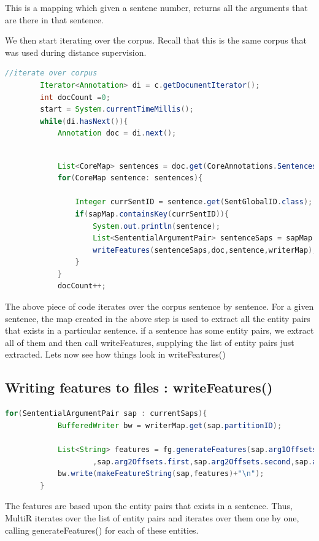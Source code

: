 \documentclass[a4paper,10pt]{report}
\begin{document}
This is a mapping which given a sentene number, returns all the arguments that are there in that sentence. 

We then start iterating over the corpus. Recall that this is the same corpus that was used during distance supervision. 
\begin{lstlisting}[language=java]
//iterate over corpus
    	Iterator<Annotation> di = c.getDocumentIterator();
    	int docCount =0;
    	start = System.currentTimeMillis();
    	while(di.hasNext()){
    		Annotation doc = di.next();
\end{lstlisting}

\begin{lstlisting}[language=java]

    		List<CoreMap> sentences = doc.get(CoreAnnotations.SentencesAnnotation.class);
    		for(CoreMap sentence: sentences){
    				
    			Integer currSentID = sentence.get(SentGlobalID.class);
    			if(sapMap.containsKey(currSentID)){
    				System.out.println(sentence);
    				List<SententialArgumentPair> sentenceSaps = sapMap.get(currSentID);
    				writeFeatures(sentenceSaps,doc,sentence,writerMap);
    			}
    		}
    		docCount++;
\end{lstlisting}
The above piece of code iterates over the corpus sentence by sentence.
For a given sentence, the map created in the above step is used to extract all the entity pairs that
exists in a particular sentence. 
if a sentence has some entity pairs, we extract all of them and then call writeFeatures, supplying the list
of entity pairs just extracted.
Lets now see how things look in writeFeatures()


\subsection{Writing features to files : writeFeatures()}

\begin{lstlisting}[language=java]
 for(SententialArgumentPair sap : currentSaps){
			BufferedWriter bw = writerMap.get(sap.partitionID);

			List<String> features = fg.generateFeatures(sap.arg1Offsets.first,sap.arg1Offsets.second
					,sap.arg2Offsets.first,sap.arg2Offsets.second,sap.arg1ID,sap.arg2ID,sentence,doc);
			bw.write(makeFeatureString(sap,features)+"\n");
		}
\end{lstlisting}
The features are based upon the entity pairs that exists in a sentence. Thus, MultiR iterates over the list of entity pairs and 
iterates over them one by one, calling generateFeatures() for each of these entities. 
\end{document}
